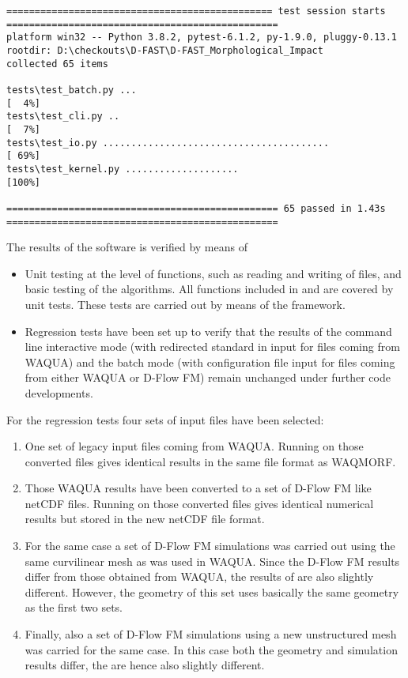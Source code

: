 \begin{Verbatim}[fontsize=\tiny]
=============================================== test session starts ================================================
platform win32 -- Python 3.8.2, pytest-6.1.2, py-1.9.0, pluggy-0.13.1
rootdir: D:\checkouts\D-FAST\D-FAST_Morphological_Impact
collected 65 items

tests\test_batch.py ...                                                                                       [  4%]
tests\test_cli.py ..                                                                                          [  7%]
tests\test_io.py ........................................                                                     [ 69%]
tests\test_kernel.py ....................                                                                     [100%]

================================================ 65 passed in 1.43s ================================================
\end{Verbatim}

The results of the software is verified by means of

\begin{itemize}
\item Unit testing at the level of functions, such as reading and writing of files, and basic testing of the algorithms.
All functions included in  and  are covered by unit tests.
These tests are carried out by means of the  framework.
\item Regression tests have been set up to verify that the results of the command line interactive mode (with redirected standard in input for files coming from WAQUA) and the batch mode (with configuration file input for files coming from either WAQUA or D-Flow FM) remain unchanged under further code developments.
\end{itemize}

For the regression tests four sets of input files have been selected:

\begin{enumerate}
\item One set of legacy input files coming from WAQUA.
Running \dfastmi on those converted files gives identical results in the same file format as WAQMORF.
\item Those WAQUA results have been converted to a set of D-Flow FM like netCDF files.
Running \dfastmi on those converted files gives identical numerical results but stored in the new netCDF file format.
\item For the same case a set of D-Flow FM simulations was carried out using the same curvilinear mesh as was used in WAQUA.
Since the D-Flow FM results differ from those obtained from WAQUA, the results of \dfastmi are also slightly different.
However, the geometry of this set uses basically the same geometry as the first two sets.
\item Finally, also a set of D-Flow FM simulations using a new unstructured mesh was carried for the same case.
In this case both the geometry and simulation results differ, the \dfastmi are hence also slightly different.
\end{enumerate}

